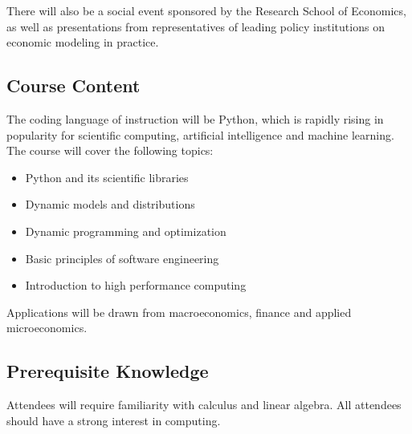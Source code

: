 \documentclass[12pt]{article}
\numberwithin{equation}{section}		%
\numberwithin{table}{section}				%
\begin{document}
There will also be a social event sponsored by the Research School of
Economics, as well as presentations from representatives of leading policy
institutions on economic modeling in practice.


\subsection*{Course Content}

The coding language of instruction will be Python, which is rapidly rising
in popularity for scientific computing, artificial intelligence and machine
learning.  The course will cover the following topics:

\begin{itemize}
    \item Python and its scientific libraries
    \item Dynamic models and distributions
    \item Dynamic programming and optimization
    \item Basic principles of software engineering
    \item Introduction to high performance computing
\end{itemize}

Applications will be drawn from macroeconomics, finance and applied
microeconomics.

\subsection*{Prerequisite Knowledge}

Attendees will require familiarity with calculus and linear algebra.
All attendees should have a strong interest in computing.


\end{document}
